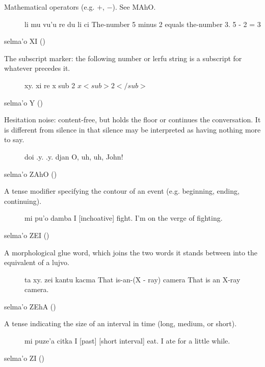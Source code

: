 Mathematical operators (e.g. $+$, $-$). See MAhO.
\begin{description}
\item[] li mu vu'u re du li ci The-number 5 minus 2 equals the-number 3. 5 - 2 = 3
\end{description}

selma'o XI () 

The subscript marker: the following number or lerfu string
    is a subscript for whatever precedes it.
\begin{description}
\item[] xy. xi re x sub 2 $x<sub>2</sub>$
\end{description}

selma'o Y () 

Hesitation noise: content-free, but holds the floor or
    continues the conversation. It is different from silence in
    that silence may be interpreted as having nothing more to
    say.
\begin{description}
\item[] doi .y. .y. djan O, uh, uh, John!
\end{description}

selma'o ZAhO () 

A tense modifier specifying the contour of an event (e.g.
    beginning, ending, continuing).
\begin{description}
\item[] mi pu'o damba I [inchoative] fight. I'm on the verge of fighting.
\end{description}

selma'o ZEI () 

A morphological glue word, which joins the two words it
    stands between into the equivalent of a lujvo.
\begin{description}
\item[] ta xy. zei kantu kacma That is-an-(X - ray) camera That is an X-ray camera.
\end{description}

selma'o ZEhA () 

A tense indicating the size of an interval in time (long,
    medium, or short).
\begin{description}
\item[] mi puze'a citka I [past] [short interval] eat. I ate for a little while.
\end{description}

selma'o ZI () 

